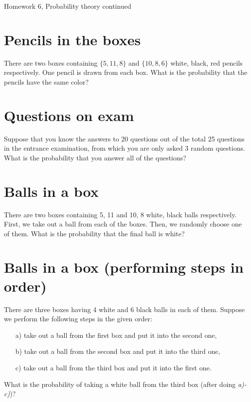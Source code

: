  \begin{center}\begin{large} Homework 6, Probability theory continued
 \end{large}\end{center}
 \bigskip

\bigskip

\tableofcontents

\section{Pencils in the boxes}
There are two boxes containing $\{5, 11, 8\}$ and $\{10, 8, 6\}$ white, black, red pencils respectively. One pencil is drawn from each box. What is the probability that the pencils have the same color?

\section{Questions on exam}
Suppose that you know the answers to 20 questions out of the total 25
questions in the entrance examination, from which you are only asked
3 random questions. What is the probability that you answer all of
the questions?

\section{Balls in a box}
There are two boxes containing {5, 11} and {10, 8} white, black balls
respectively. First, we take out a ball from each of the boxes. Then, we randomly choose one of them. What is the probability that the
final ball is white?

\section{Balls in a box (performing steps in order)}
There are three boxes having 4 white and 6 black balls in each of them.
Suppose we perform the following steps in the given order:
    \begin{enumerate}
        \item[a) ] take out a ball from the first box and put it into the second one,
        \item[b) ] take out a ball from the second box and put it into the third one,
        \item[c) ] take out a ball from the third box and put it into the first one.
    \end{enumerate}
    What is the probability of taking a white ball from the third box (after doing \textit{a)-c)})?


